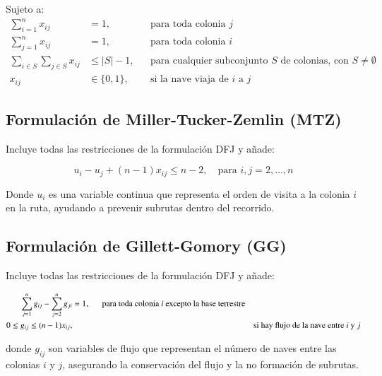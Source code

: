 \documentclass[
	spanish, %
	oneside
]{article}
\begin{document}
Sujeto a:
\begin{align}
    \sum_{i=1}^{n} x_{ij} &= 1, && \text{para toda colonia } j \\
    \sum_{j=1}^{n} x_{ij} &= 1, && \text{para toda colonia } i \\
    \sum_{i \in S}\sum_{j \in S} x_{ij} &\leq |S| - 1, && \text{para cualquier subconjunto } S \text{ de colonias, con } S \neq \emptyset \\
    x_{ij} &\in \{0, 1\}, && \text{si la nave viaja de } i \text{ a } j
\end{align}

\subsection*{Formulación de Miller-Tucker-Zemlin (MTZ)}

Incluye todas las restricciones de la formulación DFJ y añade:

\begin{equation}
    u_i - u_j + (n - 1)x_{ij} \leq n - 2, \quad \text{para } i, j = 2, \ldots, n
\end{equation}

\noindent Donde \( u_i \) es una variable continua que representa el orden de visita a la colonia \( i \) en la ruta, ayudando a prevenir subrutas dentro del recorrido.

\subsection*{Formulación de Gillett-Gomory (GG)}

Incluye todas las restricciones de la formulación DFJ y añade:

\begin{align}
    \sum_{j=1}^{n} g_{ij} - \sum_{j=2}^{n} g_{ji} &= 1, \text{\indent para toda colonia } i \text{ excepto la base terrestre} \\
    0 \leq g_{ij} \leq (n - 1)x_{ij}, && \text{si hay flujo de la nave entre } i \text{ y } j
\end{align}

donde \( g_{ij} \) son variables de flujo que representan el número de naves entre las colonias \( i \) y \( j \), asegurando la conservación del flujo y la no formación de subrutas.


\end{document}
